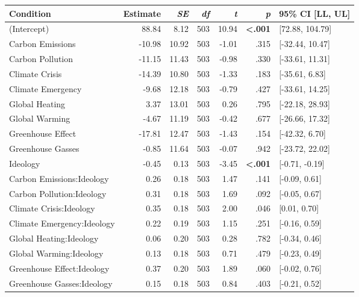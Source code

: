 \begin{table}[ht]
\centering
\begin{tabular}{lrrrrrl}
  \hline
Condition & Estimate & \textit{SE} & \textit{df} & \textit{t} & \textit{p} & 95\% CI [LL, UL] \\ 
  \hline
(Intercept) & 88.84 & 8.12 & 503 & 10.94 & \textbf{\textless  .001} & [72.88, 104.79] \\ 
  Carbon Emissions & -10.98 & 10.92 & 503 & -1.01 & .315 & [-32.44, 10.47] \\ 
  Carbon Pollution & -11.15 & 11.43 & 503 & -0.98 & .330 & [-33.61, 11.31] \\ 
  Climate Crisis & -14.39 & 10.80 & 503 & -1.33 & .183 & [-35.61, 6.83] \\ 
  Climate Emergency & -9.68 & 12.18 & 503 & -0.79 & .427 & [-33.61, 14.25] \\ 
  Global Heating & 3.37 & 13.01 & 503 & 0.26 & .795 & [-22.18, 28.93] \\ 
  Global Warming & -4.67 & 11.19 & 503 & -0.42 & .677 & [-26.66, 17.32] \\ 
  Greenhouse Effect & -17.81 & 12.47 & 503 & -1.43 & .154 & [-42.32, 6.70] \\ 
  Greenhouse Gasses & -0.85 & 11.64 & 503 & -0.07 & .942 & [-23.72, 22.02] \\ 
  Ideology & -0.45 & 0.13 & 503 & -3.45 & \textbf{\textless  .001} & [-0.71, -0.19] \\ 
  Carbon Emissions:Ideology & 0.26 & 0.18 & 503 & 1.47 & .141 & [-0.09, 0.61] \\ 
  Carbon Pollution:Ideology & 0.31 & 0.18 & 503 & 1.69 & .092 & [-0.05, 0.67] \\ 
  Climate Crisis:Ideology & 0.35 & 0.18 & 503 & 2.00 & .046 & [0.01, 0.70] \\ 
  Climate Emergency:Ideology & 0.22 & 0.19 & 503 & 1.15 & .251 & [-0.16, 0.59] \\ 
  Global Heating:Ideology & 0.06 & 0.20 & 503 & 0.28 & .782 & [-0.34, 0.46] \\ 
  Global Warming:Ideology & 0.13 & 0.18 & 503 & 0.71 & .479 & [-0.23, 0.49] \\ 
  Greenhouse Effect:Ideology & 0.37 & 0.20 & 503 & 1.89 & .060 & [-0.02, 0.76] \\ 
  Greenhouse Gasses:Ideology & 0.15 & 0.18 & 503 & 0.84 & .403 & [-0.21, 0.52] \\ 
   \hline
\end{tabular}
\end{table}
